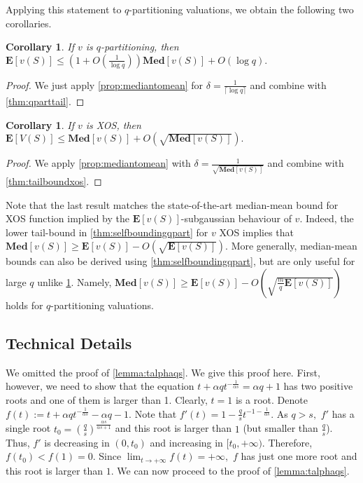 \documentclass[11pt]{article}\usepackage{amsfonts}
\newtheorem{corollary}[theorem]{Corollary}
\numberwithin{theorem}{subsection}
\newcommand{\median}{\mathbf{Med}}
\newcommand{\expect}{\mathbf{E}}
\begin{document}
\noindent
Applying this statement to $q$-partitioning valuations, we obtain the following two corollaries.

\begin{corollary}
\label{cor:medianmeanqpart}
If $v$ is $q$-partitioning, then 
$\expect[v(S)]\le (1 + O(\frac{1}{\log q}))\median[v(S)] + O(\log q).$
\end{corollary}
\begin{proof}
We just apply \cref{prop:mediantomean} for $\delta = \frac{1}{\lceil\log q\rceil}$ and combine with 
\cref{thm:qparttail}.
\end{proof}

\begin{corollary}
If $v$ is XOS, 
then $\expect[V(S)]\le \median[v(S)] + O(\sqrt{\median[v(S)]}).$
\end{corollary}
\begin{proof}
We apply \cref{prop:mediantomean} with $\delta = \frac{1}{\sqrt{\median[v(S)]}}$ and combine with 
\cref{thm:tailboundxos}.
\end{proof}

\noindent
Note that the last result matches the state-of-the-art median-mean bound for XOS function implied by the $\expect[v(S)]$-subgaussian behaviour of $v.$ Indeed, the lower tail-bound in \cref{thm:selfboundingqpart} for $v$ XOS
implies that $\median[v(S)]\ge \expect[v(S)] - 
O(\sqrt{\expect[v(S)]}).
$ More generally, median-mean bounds can also be derived using \cref{thm:selfboundingqpart}, but are only useful for large $q$ unlike \cref{cor:medianmeanqpart}. Namely,
 $\median[v(S)]\ge \expect[v(S)] - 
O(\sqrt{\frac{m}{q}\expect[v(S)]})
$ holds for $q$-partitioning valuations. 

\subsection{Technical Details}
\label{section:appendixtalphaqs}
We omitted the proof of \cref{lemma:talphaqs}. We give this proof here. First, however, we need to show that the equation $t + \alpha q t^{-\frac{1}{\alpha s}} = \alpha q + 1$ has two positive roots and one of them is larger than 1. Clearly, $t = 1$ is a root. Denote $f(t):= t + \alpha q t^{-\frac{1}{\alpha s}}-\alpha q - 1.$ Note that 
$f'(t) = 1 - \frac{q}{s}t^{-1-\frac{1}{\alpha s}}.$ As $q>s,$ $f'$ has a single root $t_0 = \left(\frac{q}{s}\right)^\frac{\alpha s}{\alpha s + 1}$ and this root is larger than $1$ (but smaller than $\frac{q}{s}$). Thus, $f'$ is decreasing in $(0,t_0) $ and increasing in $[t_0, +\infty).$ Therefore, $f(t_0)<f(1) = 0.$ Since $\lim_{t\longrightarrow+\infty} f(t) =+\infty,$ $f$ has just one more root and this root is larger than $1.$ We can now proceed to the proof of \cref{lemma:talphaqs}.
\end{document}
